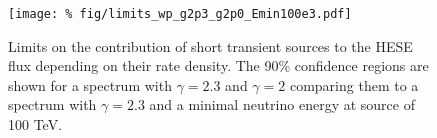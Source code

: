 

\begin{figure}[h]
\centering
 \captionsetup{width=.9\textwidth}
\texttt{[image: \%
fig/limits\_wp\_g2p3\_g2p0\_Emin100e3.pdf]}
\caption{Limits on the contribution of short transient sources to the HESE 
flux depending on their rate density. The 90\% confidence regions are shown for 
a spectrum with $\gamma=2.3$ and $\gamma=2$ comparing them to a spectrum with 
$\gamma=2.3$ and a minimal neutrino energy at source of 100 TeV.}
\label{fig:limits_wp_g2p3_g2p0_Emin100e3}
\end{figure}


